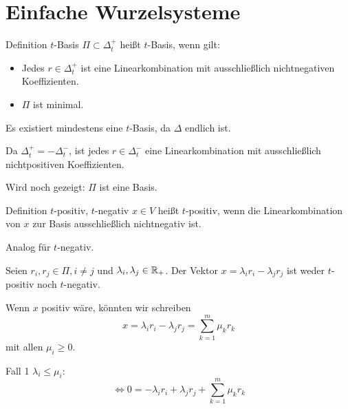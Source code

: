 \documentclass[18pt]{beamer}
\begin{document}
\section{Einfache Wurzelsysteme}
\begin{frame}{Definition \( t \)-Basis}
    \( \Pi \subset \Delta_t^+ \) heißt \( t \)-Basis, 
    wenn gilt:
    \begin{itemize}
        \item Jedes \( r \in \Delta_t^+ \) ist 
        eine Linearkombination mit ausschließlich 
        nichtnegativen Koeffizienten.
        \item \( \Pi \) ist minimal.
    \end{itemize} \pause
    Es existiert mindestens eine \( t \)-Basis, 
    da \( \Delta \) endlich ist. \pause
    
    Da \( \Delta_t^+ = - \Delta_t^- \), ist jedes 
    \( r \in \Delta_t^- \) eine Linearkombination 
    mit ausschließlich nichtpositiven Koeffizienten.

    \pause
    Wird noch gezeigt: \( \Pi \) ist eine Basis.
\end{frame}

\begin{frame}{Definition \(t\)-positiv, \( t \)-negativ}
    \( x \in V \) heißt \(t\)-positiv, wenn 
    die Linearkombination von \(x\) zur 
    Basis ausschließlich nichtnegativ ist.

    Analog für \( t \)-negativ.
\end{frame}

\begin{frame}
    \begin{satz} %
        Seien \( r_i, r_j \in \Pi, i \neq j \) und 
        \( \lambda_i, \lambda_j \in \mathbb{R}_+ \). 
        Der Vektor \( x = \lambda_i r_i - \lambda_j r_j \) 
        ist weder \( t \)-positiv noch \( t \)-negativ.
    \end{satz}
\end{frame}

\begin{frame}
    \begin{bew}
        Wenn \(x\) positiv wäre, könnten 
        wir schreiben 
        \[ x = \lambda_i r_i - \lambda_j r_j 
        = \sum_{k=1}^m \mu_k r_k \]
        mit allen \( \mu_i \geq 0 \). \pause

        Fall 1 \( \lambda_i \leq \mu_i \):
        \[ \Leftrightarrow 0 
        = - \lambda_i r_i + \lambda_j r_j 
        + \sum_{k=1}^m \mu_k r_k \]
        
        \renewcommand{\qedsymbol}{}
    \end{bew}
\end{frame}
\end{document}
